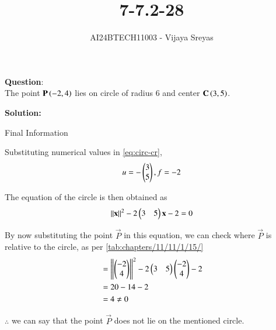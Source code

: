 \documentclass[journal]{IEEEtran}
\begin{document}

\vspace{3cm}

\title{7-7.2-28}
\author{AI24BTECH11003 - Vijaya Sreyas
}
{\let\newpage\relax\maketitle}

\renewcommand{\thefigure}{\theenumi}
\renewcommand{\thetable}{\theenumi}
\setlength{\intextsep}{10pt} %


\renewcommand{\thetable}{\theenumi}


\textbf{Question}:\\
The point $\mathbf{P}\left(-2,4\right)$ lies on circle of radius 6 and center $\mathbf{C}\left(3,5\right)$.

\textbf{Solution: }

\begin{table}[h!]    
  \centering
  
  \caption{Final Information}
  \label{7-7.2-28-tab-0}
\end{table}

Substituting numerical values in \eqref{eq:circ-cr},
\begin{align}
    u=-\begin{pmatrix}3 \\ 5\end{pmatrix}, f=-2
\end{align}

The equation of the circle is then obtained as
\begin{align}
    \left\lVert\mathbf{x}\right\rVert^2 -2\begin{pmatrix}3 & 5\end{pmatrix}\mathbf{x} -2 = 0
\end{align}

By now substituting the point $\vec{P}$ in this equation, we can check where $\vec{P}$ is relative to the circle, as per \eqref{tab:chapters/11/11/1/15/}
\begin{align}
    &= \left\lVert\begin{pmatrix}-2 \\ 4\end{pmatrix}\right\rVert^2-2\begin{pmatrix}3 & 5\end{pmatrix}\begin{pmatrix}-2 \\ 4\end{pmatrix} -2 \\
    &= 20 - 14 - 2 \\
    &= 4 \neq 0
\end{align}

$\therefore$ we can say that the point $\vec{P}$ does not lie on the mentioned circle.
\end{document}
